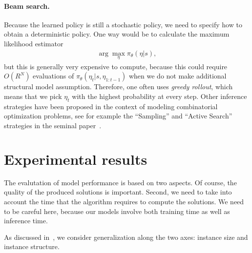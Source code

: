 \documentclass[a4paper]{report}
\theoremstyle{definition}
\theoremstyle{plain}
\begin{document}
\paragraph{Beam search.}

Because the learned policy is still a stochastic policy, we need to specify how
to obtain a deterministic policy.
%
One way would be to calculate the maximum likelihood estimator
\begin{align*}
  \arg\max_{\eta} \pi_\theta(\eta | s) ,
\end{align*}
but this is generally very expensive to compute, because this could require
$O(R^{N})$ evaluations of $\pi_\theta(\eta_{t} | s, \eta_{1:t-1})$ when we do
not make additional structural model assumption.
%
Therefore, one often uses \textit{greedy rollout}, which means that we pick $\eta_{t}$ with
the highest probability at every step.
Other inference strategies have been proposed in the context of modeling
combinatorial optimization problems, see for example the ``Sampling'' and
``Active Search'' strategies in the seminal
paper~\cite{belloNeuralCombinatorialOptimization2017}.


\clearpage
\section{Experimental results}\label{sec:results}

The evalutation of model performance is based on two aspects. Of course, the
quality of the produced solutions is important. Second, we need to take into
account the time that the algorithm requires to compute the solutions. We need
to be careful here, because our models involve both training time as well as
inference time.

As discussed in~, we consider generalization along the two
axes: instance size and instance structure.
\end{document}
